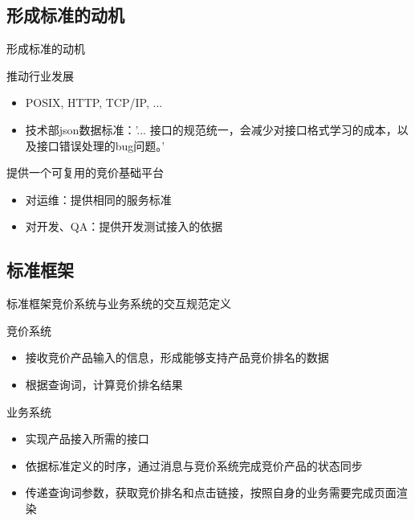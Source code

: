 \documentclass{beamer}
\begin{document}
\begin{CJK}{UTF8}{gbsn}
\subsection{形成标准的动机}

\begin{frame}{形成标准的动机}
  \begin{block}{推动行业发展}
    \begin{itemize}
      \item {
        POSIX, HTTP, TCP/IP, ...
        \pause
      }
      \item {
        技术部json数据标准：'... 接口的规范统一，会减少对接口格式学习的成本，以及接口错误处理的bug问题。'
        \pause
      }
    \end{itemize}
  \end{block}
  \begin{block}{提供一个可复用的竞价基础平台}
    \begin{itemize}
    \item {对运维：提供相同的服务标准}
    \item {对开发、QA：提供开发测试接入的依据}
    \end{itemize}
  \end{block}
\end{frame}

\subsection{标准框架}

\begin{frame}{标准框架}{竞价系统与业务系统的交互规范定义}
  \begin{block}{竞价系统}
    \begin{itemize}
    \item {接收竞价产品输入的信息，形成能够支持产品竞价排名的数据}
    \item {根据查询词，计算竞价排名结果}
    \end{itemize}
    \pause
  \end{block}
  \begin{block}{业务系统}
    \begin{itemize}
    \item {
      实现产品接入所需的接口
      \pause
    }
    \item {
      依据标准定义的时序，通过消息与竞价系统完成竞价产品的状态同步
      \pause
    }
    \item {
      传递查询词参数，获取竞价排名和点击链接，按照自身的业务需要完成页面渲染
    }
    \end{itemize}
  \end{block}
\end{frame}


\end{CJK}
\end{document}
